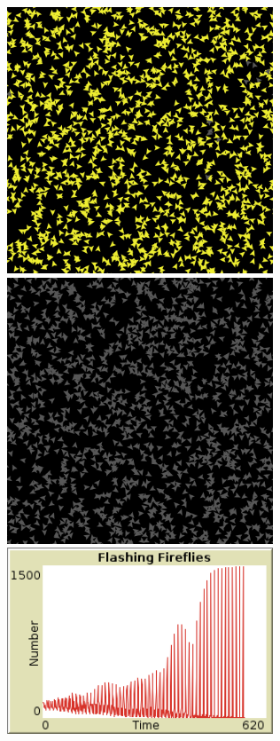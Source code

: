 \documentclass{article}
\begin{document}
\begin{enumerate}
\includegraphics[width=300px]{Fireflies2.png}\\
\includegraphics[width=300px]{Fireflies3.png}\\
\includegraphics[width=300px]{Fireflies4.png}\\

\end{enumerate}



\end{document}
